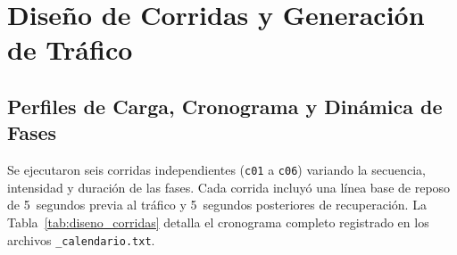 \documentclass[11pt,a4paper]{article}
\begin{document}
\section{Diseño de Corridas y Generación de Tráfico}

\subsection{Perfiles de Carga, Cronograma y Dinámica de Fases}
Se ejecutaron seis corridas independientes (\texttt{c01} a \texttt{c06}) variando la secuencia, intensidad y duración de las fases. Cada corrida incluyó una línea base de reposo de 5~segundos previa al tráfico y 5~segundos posteriores de recuperación. La Tabla~\ref{tab:diseno_corridas} detalla el cronograma completo registrado en los archivos \texttt{\_calendario.txt}.
\end{document}

